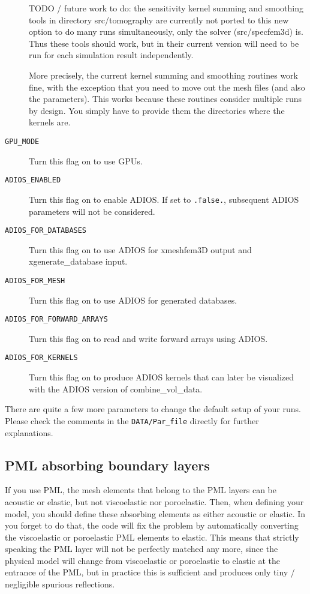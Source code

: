\begin{description}
TODO / future work to do: the sensitivity kernel summing and smoothing tools in directory src/tomography are currently not ported to this new option to do many runs simultaneously, only the solver (src/specfem3d) is. Thus these tools should work, but in their current version will need to be run for each simulation result independently.\newline

More precisely, the current kernel summing and smoothing routines work fine, with the exception that you need to move out the mesh files (and also the parameters). This works because these routines consider multiple runs by design. You simply have to provide them the directories where the kernels are.\newline

\item [{\texttt{GPU\_MODE}}] Turn this flag on to use GPUs.

\item [\texttt{ADIOS\_ENABLED}] Turn this flag on to enable ADIOS. If set to \texttt{.false.}, subsequent ADIOS
parameters will not be considered.
\item [\texttt{ADIOS\_FOR\_DATABASES}] Turn this flag on to use ADIOS for xmeshfem3D output and
xgenerate\_database input.
\item [\texttt{ADIOS\_FOR\_MESH}]  Turn this flag on to use ADIOS for generated databases.
\item [\texttt{ADIOS\_FOR\_FORWARD\_ARRAYS}] Turn this flag on to read and write forward arrays using ADIOS.
\item [\texttt{ADIOS\_FOR\_KERNELS}] Turn this flag on to produce ADIOS kernels that can later be visualized with the ADIOS version of combine\_vol\_data.
\end{description}
There are quite a few more parameters to change the default setup of your runs. Please check the comments in the \texttt{DATA/Par\_file} directly for further explanations.\newline


\subsection{PML absorbing boundary layers}

If you use PML, the mesh elements that belong to the PML layers can
be acoustic or elastic, but not viscoelastic nor poroelastic. Then,
when defining your model, you should define these absorbing elements
as either acoustic or elastic. In you forget to do that, the code
will fix the problem by automatically converting the viscoelastic
or poroelastic PML elements to elastic. This means that strictly speaking
the PML layer will not be perfectly matched any more, since the physical
model will change from viscoelastic or poroelastic to elastic at the
entrance of the PML, but in practice this is sufficient and produces
only tiny / negligible spurious reflections.\newline


